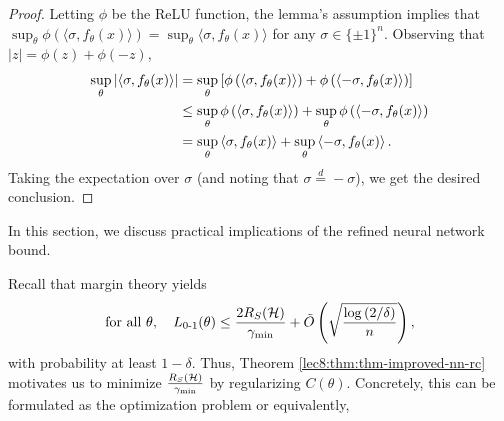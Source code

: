 \begin{proof}
Letting $\phi$ be the ReLU function, the lemma's assumption implies that $\sup_{\theta} \phi\left(\langle \sigma, f_{\theta}(x) \rangle\right) = \sup_{\theta}\langle \sigma, f_{\theta}(x) \rangle$ for any $\sigma \in \{\pm 1\}^n$. Observing that $|z| = \phi(z) + \phi(-z)$, 
\begin{align}
\sup_{\theta} \abs{\inprod{ \sigma, f_{\theta}(x) }}%
&= \sup_{\theta} \left[ \phi \l(\inprod{ \sigma, f_{\theta}(x) } \r) + \phi \l(\inprod{-\sigma, f_{\theta}(x) } \r)\right] \\
&\le \sup_{\theta}  \phi \l(\inprod{ \sigma, f_{\theta}(x) } \r) +  \sup_{\theta}  \phi \l(\inprod{-\sigma, f_{\theta}(x) } \r)  \\
&= \sup_{\theta} \inprod{ \sigma, f_{\theta}(x) } +  \sup_{\theta}  \inprod{-\sigma, f_{\theta}(x) }. 
\end{align}
Taking the expectation over $\sigma$ (and noting that $\sigma \overset d = -\sigma$), we get the desired conclusion.
\end{proof}


In this section, we discuss practical implications of the refined neural network bound. 


Recall that margin theory yields
\begin{equation}
\text{for all } \theta, \quad L_{\textup{0-1}}(\theta) \leq \frac{2R_S(\mathcal H)}{\gamma_{\mathrm{min}}} + \tilde{O}\left(\sqrt{\frac{\log \left( 2 / \delta \right)}{n}}\right), \label{lec8:eqn:margin-bound}
\end{equation}
with probability at least $1 -\delta$. Thus, Theorem \ref{lec8:thm:thm-improved-nn-rc} motivates us to minimize $\frac{R_S(\mathcal H)}{\gamma_{\mathrm{min}}}$ by regularizing $C(\theta)$. Concretely, this can be formulated as the optimization problem 
or equivalently,

